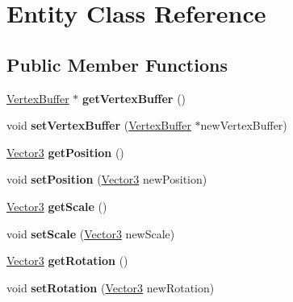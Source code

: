 \hypertarget{class_entity}{}\section{Entity Class Reference}
\label{class_entity}
\subsection*{Public Member Functions}
\begin{DoxyCompactItemize}
\item 
\hypertarget{class_entity_a73306699ac0699098b3ce2aaea4f5c95}{}\hyperlink{class_vertex_buffer}{Vertex\+Buffer} $\ast$ {\bfseries get\+Vertex\+Buffer} ()\label{class_entity_a73306699ac0699098b3ce2aaea4f5c95}

\item 
\hypertarget{class_entity_a422b66f3129f0187e5bb8377cb1c1150}{}void {\bfseries set\+Vertex\+Buffer} (\hyperlink{class_vertex_buffer}{Vertex\+Buffer} $\ast$new\+Vertex\+Buffer)\label{class_entity_a422b66f3129f0187e5bb8377cb1c1150}

\item 
\hypertarget{class_entity_a66067332cc542b2477fb16587deddea1}{}\hyperlink{struct_vector3}{Vector3} {\bfseries get\+Position} ()\label{class_entity_a66067332cc542b2477fb16587deddea1}

\item 
\hypertarget{class_entity_a22cc6e11e883b1f3c1e14b487f9af27e}{}void {\bfseries set\+Position} (\hyperlink{struct_vector3}{Vector3} new\+Position)\label{class_entity_a22cc6e11e883b1f3c1e14b487f9af27e}

\item 
\hypertarget{class_entity_a3beb3aa687cbb8c3b3272a63bb1cc470}{}\hyperlink{struct_vector3}{Vector3} {\bfseries get\+Scale} ()\label{class_entity_a3beb3aa687cbb8c3b3272a63bb1cc470}

\item 
\hypertarget{class_entity_a590be9bcdef23da270598f65224001c0}{}void {\bfseries set\+Scale} (\hyperlink{struct_vector3}{Vector3} new\+Scale)\label{class_entity_a590be9bcdef23da270598f65224001c0}

\item 
\hypertarget{class_entity_a036244a9ccfd24a7b151da29fa68e03b}{}\hyperlink{struct_vector3}{Vector3} {\bfseries get\+Rotation} ()\label{class_entity_a036244a9ccfd24a7b151da29fa68e03b}

\item 
\hypertarget{class_entity_a916003fb2993e071219862aedd046798}{}void {\bfseries set\+Rotation} (\hyperlink{struct_vector3}{Vector3} new\+Rotation)\label{class_entity_a916003fb2993e071219862aedd046798}


\end{DoxyCompactItemize}
